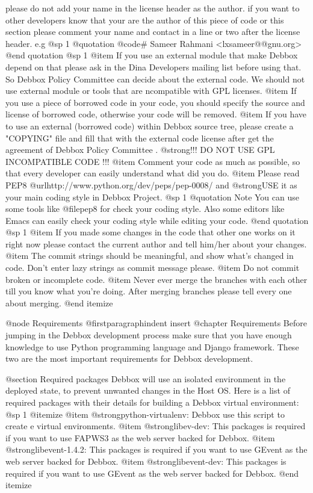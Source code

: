 please do not add your name in the license header as the author. if you want to other developers know that your are
the author of this piece of code or this section please comment your name and contact in a line or two after the license header. 
e.g
@sp 1
@quotation
@code{# Sameer Rahmani <lxsameer@@gnu.org>}
@end quotation
@sp 1
@item
If you use an external module that make Debbox depend on that please ask in the Dina Developers mailing list before using that.
So Debbox Policy Committee can decide about the external code. We should not use external module or tools that are ncompatible with  GPL licenses.
@item
If you use a piece of borrowed code in your code, you should specify the source and license of borrowed code, otherwise your code will be removed. 
@item
If you have to use an external (borrowed code) within Debbox source tree, please create a "COPYING" file and fill that with the external code license after get the agreement of Debbox Policy Committee .  @strong{!!! DO NOT USE GPL INCOMPATIBLE CODE !!!}
@item
Comment your code as much as possible, so that every developer can easily understand what did you do.
@item
Please read PEP8 @url{http://www.python.org/dev/peps/pep-0008/} and @strong{USE} it as your main coding style in Debbox Project.
@sp 1
@quotation Note
You can use some tools like @file{pep8} for check your coding style. Also some editors like Emacs can easily check your coding style while 
editing your code.
@end quotation
@sp 1
@item
If you made some changes in the code that other one works on it right now please contact the current author and tell him/her about your changes.
@item
The commit strings should be meaningful, and show what's changed in code. Don't enter lazy strings as commit message please.
@item
Do not commit broken or incomplete code.
@item
Never ever merge the branches with each other till you know what you're doing. After merging branches please tell every one about merging.
@end itemize




@node Requirements
@firstparagraphindent insert
@chapter Requirements
Before jumping in the Debbox development process make sure that you have enough knowledge to use
Python programming language and Django framework. These two are the most important requirements
for Debbox development.

@section Required packages
Debbox will use an isolated environment in the deployed state, to prevent unwanted changes in the
Host OS. Here is a list of required packages with their details for building a Debbox virtual environment:
@sp 1
@itemize
@item
@strong{python-virtualenv}: Debbox use this script to create e virtual environments.
@item
@strong{libev-dev}: This packages is required if you want to use FAPWS3 as the web server backed for Debbox.
@item
@strong{libevent-1.4.2}: This packages is required if you want to use GEvent as the web server backed for Debbox.
@item
@strong{libevent-dev}: This packages is required if you want to use GEvent as the web server backed for Debbox.
@end itemize

